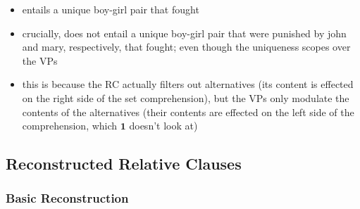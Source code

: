 \documentclass{article}
\newcommand{\one}{\textbf{1}}
\newcommand{\some}{\textbf{some}}
\newcommand{\pro}{\textbf{pro}}
\renewcommand{\leadsto}{\rightsquigarrow}
\newcommand{\lilstrut}{\setlength\bigstrutjot{2pt}\bigstrut}
\begin{document}
\begin{itemize}[leftmargin=*]
  \item
    entails a unique boy-girl pair that fought
  \item
    crucially, does not entail a unique boy-girl pair that were punished by
    john and mary, respectively, that fought; even though the uniqueness
    scopes over the VPs
  \item
    this is because the RC actually filters out alternatives (its content is
    effected on the right side of the set comprehension), but the VPs only
    modulate the contents of the alternatives (their contents are effected on
    the left side of the comprehension, which $\one$ doesn't look at)
\end{itemize}



\subsection{Reconstructed Relative Clauses}

\subsubsection{Basic Reconstruction}


\bigskip
\end{document}
